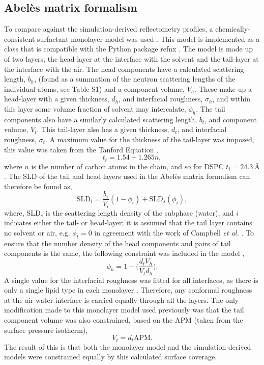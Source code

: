\documentclass[amsmath,amssymb,twocolumn,superscriptaddress]{revtex4-1}
\begin{document}
\subsection{Abel\`{e}s matrix formalism}
To compare against the simulation-derived reflectometry profiles, a
chemically-consistent surfactant monolayer model was
used \cite{mccluskey_bayesian_2019,mccluskey_lipids_at_airdes_2019}.
This model is implemented as a class that is compatible with the Python
package refnx \cite{nelson_refnx_2019,nelson_refnx_2018}.
The model is made up of two layers; the head-layer at the interface with
the solvent and the tail-layer at the interface with the air.
The head components have a calculated scattering length, $b_h$, (found as a
summation of the neutron scattering lengths of the individual atoms, see
Table S1) and a component volume, $V_h$.
These make up a head-layer with a given thickness, $d_h$, and interfacial
roughness, $\sigma_h$, and within this layer some volume fraction of
solvent may intercalate, $\phi_h$.
The tail components also have a similarly calculated scattering
length, $b_t$, and component volume, $V_t$.
This tail-layer also has a given thickness, $d_t$, and interfacial
roughness, $\sigma_t$.
A maximum value for the thickness of the tail-layer was imposed, this
value was taken from the Tanford Equation \cite{tanford_hydrophobic_1980},
%
\begin{equation}
  t_t = 1.54 + 1.265n,
\end{equation}
%
where $n$ is the number of carbon atoms in the chain, and so for
DSPC $t_t = \SI{24.3}{\angstrom}$.
The SLD of the tail and head layers used in the Abel\`{e}s matrix formalism
can therefore be found as,
%
\begin{equation}
  \text{SLD}_i = \frac{b_i}{V_i}(1 - \phi_i) + \text{SLD}_s(\phi_i),
\end{equation}
%
where, $\text{SLD}_s$ is the scattering length density of the subphase
(water), and $i$ indicates either the tail- or head-layer; it is assumed
that the tail layer contains no solvent or air, e.g. $\phi_t = 0$ in
agreement with the work of
Campbell \emph{et al.} \cite{campbell_structure_2018}.
To ensure that the number density of the head components and pairs of tail
components is the same, the following constraint was included in the
model \cite{braun_polymers_2017},
%
\begin{equation}
  \phi_h = 1 - \bigg(\frac{d_tV_h}{V_td_h}\bigg).
\end{equation}
%
A single value for the interfacial roughness was fitted for all interfaces, as
there is only a single lipid type in each
monolayer \cite{campbell_structure_2018}.
Therefore, any conformal roughness at the air-water interface is carried
equally through all the layers.
The only modification made to this monolayer model used previously was that
the tail component volume was also constrained, based on the APM (taken
from the surface pressure isotherm),
%
\begin{equation}
  V_t = d_t \text{APM}.
\end{equation}
%
The result of this is that both the monolayer model and the
simulation-derived models were constrained equally by this calculated
surface coverage.
\end{document}

